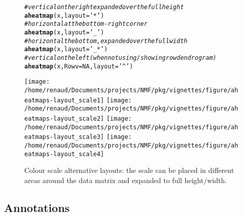\documentclass[a4paper]{article}\usepackage[]{graphicx}\usepackage[]{color}
\makeatletter
\newcommand{\hlnum}[1]{\textcolor[rgb]{0.686,0.059,0.569}{#1}}%
\newcommand{\hlstr}[1]{\textcolor[rgb]{0.192,0.494,0.8}{#1}}%
\newcommand{\hlcom}[1]{\textcolor[rgb]{0.678,0.584,0.686}{\textit{#1}}}%
\newcommand{\hlstd}[1]{\textcolor[rgb]{0.345,0.345,0.345}{#1}}%
\newcommand{\hlkwc}[1]{\textcolor[rgb]{0.333,0.667,0.333}{#1}}%
\newcommand{\hlkwd}[1]{\textcolor[rgb]{0.737,0.353,0.396}{\textbf{#1}}}%
\newenvironment{kframe}{%
 \def\at@end@of@kframe{}%
 \ifinner\ifhmode%
  \def\at@end@of@kframe{\end{minipage}}%
  \begin{minipage}{\columnwidth}%
 \fi\fi%
 \def\FrameCommand##1{\hskip\@totalleftmargin \hskip-\fboxsep
 \colorbox{shadecolor}{##1}\hskip-\fboxsep
     \hskip-\linewidth \hskip-\@totalleftmargin \hskip\columnwidth}%
 \MakeFramed {\advance\hsize-\width
   \@totalleftmargin\z@ \linewidth\hsize
   \@setminipage}}%
 {\par\unskip\endMakeFramed%
 \at@end@of@kframe}
\newenvironment{knitrout}{}{} %
\makeatother
\begin{document}
\begin{figure}[h!]
\begin{knitrout}\small
{}\color{fgcolor}\begin{kframe}
\begin{alltt}
\hlcom{# vertical on the right expanded over the full height}
\hlkwd{aheatmap}\hlstd{(x,} \hlkwc{layout} \hlstd{=} \hlstr{'*'}\hlstd{)}
\hlcom{# horizontal at the bottom-right corner}
\hlkwd{aheatmap}\hlstd{(x,} \hlkwc{layout} \hlstd{=} \hlstr{'_'}\hlstd{)}
\hlcom{# horizontal the bottom, expanded over the full width}
\hlkwd{aheatmap}\hlstd{(x,} \hlkwc{layout} \hlstd{=} \hlstr{'_*'}\hlstd{)}
\hlcom{# vertical on the left (when not using/showing row dendrogram)}
\hlkwd{aheatmap}\hlstd{(x,} \hlkwc{Rowv} \hlstd{=} \hlnum{NA}\hlstd{,} \hlkwc{layout} \hlstd{=} \hlstr{'^'}\hlstd{)}
\end{alltt}
\end{kframe}
\texttt{[image: /home/renaud/Documents/projects/NMF/pkg/vignettes/figure/aheatmaps-layout\_scale1]} 
\texttt{[image: /home/renaud/Documents/projects/NMF/pkg/vignettes/figure/aheatmaps-layout\_scale2]} 
\texttt{[image: /home/renaud/Documents/projects/NMF/pkg/vignettes/figure/aheatmaps-layout\_scale3]} 
\texttt{[image: /home/renaud/Documents/projects/NMF/pkg/vignettes/figure/aheatmaps-layout\_scale4]} 

\end{knitrout}
\caption{Colour scale alternative layouts: the scale can be placed in different
areas around the data matrix and expanded to full height/width.}
\label{fig:layout_scale}
\end{figure}


\subsection{Annotations}
\end{document}
